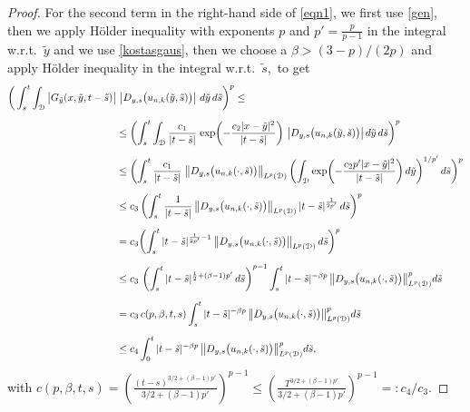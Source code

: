 \documentclass[reqno]{amsart}
\numberwithin{equation}{section}
\newcommand{\cd}{\mathcal{D}}
\begin{document}
\begin{proof}
For the second term in the right-hand side of \eqref{eqn1}, we first use \eqref{gen}, then we apply H\"older inequality with exponents $p $ and $ p'=\tfrac{p}{p-1}$ in the integral w.r.t.\ $ \tilde{y} $ and we use \eqref{kostasgaus}, then we choose a $ \beta>(3-p)/(2p) $ and apply H\"older inequality in the integral w.r.t.\ $ \tilde{s}, $ to get
\allowdisplaybreaks
\begin{align*}
\bigg(\int_s^t\int_{\cd}\big{|}G_{\Tilde{y}}(x,\Tilde{y},t-\Tilde{s})\big{|}&\ \big{|}D_{y,s}\bigl{(}u_{n,k}(\Tilde{y},
\Tilde{s})\bigr{)}\big{|}\ d\Tilde{y}\,d\Tilde{s}\bigg)^p \leq
\\[0.2cm]
&\leq\biggl(\int_s^t\int_{\cd}\dfrac{c_1}{|t-\Tilde{s}|}\; \text{exp}\biggl(-\frac{c_2|x-\Tilde{y}|^2}{|t-\tilde{s}|}\biggr)
\ \big|D_{y,s}\bigl(u_{n,k}(\Tilde{y},\Tilde{s})\bigr)\big|\,d\Tilde{y}\,d\Tilde{s}\biggr)^p
\\[0.2cm]
&\leq\biggl(\int_s^t\dfrac{c_1}{|t-\Tilde{s}|} \; \big\|D_{y,s}\bigl(u_{n,k}(\cdot,\Tilde{s})\bigr)\big\|_{L^p(\cd)}
\left(\int_{\cd}\text{exp}\biggl{(}-\frac{c_2 p' |x-\Tilde{y}|^2}{|t-\tilde{s}|}\biggr)\, d\Tilde{y}\right)^{1/p'} d\Tilde{s}\biggr)^p
\\[0.2cm]
&\leq c_3 \, \biggl(\int_s^t\dfrac{1}{|t-\Tilde{s}|} \, \big\|D_{y,s}\bigl(u_{n,k}(\cdot,\Tilde{s})\bigr) \big\|_{L^p(\cd)}\, |t-\Tilde{s}|^{\frac{1}{2p'}} \, d\Tilde{s}\biggr)^p
\\[0.2cm]
&=c_3 \biggl{(}\int_s^t |t-\Tilde{s}|^{\frac{1}{2p'}-1} \, \big\|D_{y,s}\bigl(u_{n,k}(\cdot,\Tilde{s})\bigr) \big\|_{L^p(\cd)} \, d\Tilde{s}\biggr)^p
\\[0.2cm]
&\leq
c_3 \, \left(\int_s^t |t-\Tilde{s}|^{\frac{1}{2}+(\beta-1)p'}\, d\Tilde{s}\right)^{p-1}
\int_s^t |t-\Tilde{s}|^{-\beta p} \, \big{\|}D_{y,s}\bigl{(}u_{n,k}(\cdot,\Tilde{s})\bigr{)} \big\|^p_{L^p(\cd)}d\Tilde{s}
\\[0.2cm]
&= c_3\,c(p,\beta,t,s) \int_s^t  |t-\Tilde{s}|^{-\beta p} \,  \big{\|}D_{y,s}\bigl{(}u_{n,k}(\cdot,\Tilde{s})\bigr{)} \big\|^p_{L^p(\cd)}d\Tilde{s}
\\[0.2cm]
&\leq c_4 \int_0^t  |t-\Tilde{s}|^{-\beta p} \, \big{\|}D_{y,s}\bigl{(}u_{n,k}(\cdot,\Tilde{s})\bigr{)} \big\|^p_{L^p(\cd)}d\Tilde{s} ,
\end{align*}
with $ c(p,\beta, t,s)=\left(\tfrac{(t-s)^{3/2+(\beta-1)p'}}{3/2+(\beta-1)p'}\right)^{p-1} \leq \left(\tfrac{T^{3/2+(\beta-1)p'}}{3/2+(\beta-1)p'}\right)^{p-1}  =:c_4/c_3. $ 


\end{proof}
\end{document}
